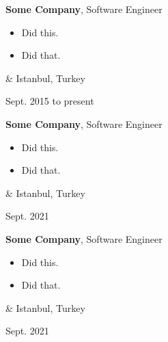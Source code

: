 \documentclass[10pt, letterpaper]{article}
\newenvironment{highlights}{
        \begin{itemize}[
                topsep=0pt,
                parsep=0.10 cm,
                partopsep=0pt,
                itemsep=0pt,
                after=\vspace{-1\baselineskip},
                leftmargin=0.4 cm + 3pt
            ]
    }{
        \end{itemize}
    } %
\let\originalTabularx\tabularx
\let\originalEndTabularx\endtabularx
\renewenvironment{tabularx}{\bgroup\centering\originalTabularx}{\originalEndTabularx\par\egroup}
\begin{document}
        \vspace{0.2 cm}
        \begin{tabularx}{
            \textwidth-0.4 cm-0.13cm
        }{
            K{0.2 cm}
            R{4.1 cm}
        }
            \textbf{Some Company}, Software Engineer

            \vspace{0.10 cm}

            \begin{highlights}
                \item Did this.
                \item Did that.
            \end{highlights}
            &
            Istanbul, Turkey

            Sept. 2015 to present
        \end{tabularx}

        \vspace{0.2 cm}
        \begin{tabularx}{
            \textwidth-0.4 cm-0.13cm
        }{
            K{0.2 cm}
            R{4.1 cm}
        }
            \textbf{Some Company}, Software Engineer

            \vspace{0.10 cm}

            \begin{highlights}
                \item Did this.
                \item Did that.
            \end{highlights}
            &
            Istanbul, Turkey

            Sept. 2021
        \end{tabularx}

        \vspace{0.2 cm}
        \begin{tabularx}{
            \textwidth-0.4 cm-0.13cm
        }{
            K{0.2 cm}
            R{4.1 cm}
        }
            \textbf{Some Company}, Software Engineer

            \vspace{0.10 cm}

            \begin{highlights}
                \item Did this.
                \item Did that.
            \end{highlights}
            &
            Istanbul, Turkey

            Sept. 2021
        \end{tabularx}
\end{document}
